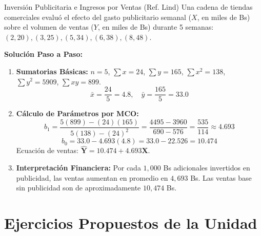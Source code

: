 \begin{ejemplo}{Inversión Publicitaria e Ingresos por Ventas (Ref. Lind)}
Una cadena de tiendas comerciales evaluó el efecto del gasto publicitario semanal ($X$, en miles de Bs) sobre el volumen de ventas ($Y$, en miles de Bs) durante 5 semanas:
$(2, 20), (3, 25), (5, 34), (6, 38), (8, 48)$.

\tcbline
\textbf{Solución Paso a Paso:}
\begin{enumerate}
    \item \textbf{Sumatorias Básicas:}
    $n = 5$, $\sum x = 24$, $\sum y = 165$, $\sum x^2 = 138$, $\sum y^2 = 5909$, $\sum xy = 899$.
    \[
    \bar{x} = \frac{24}{5} = 4.8, \quad \bar{y} = \frac{165}{5} = 33.0
    \]
    
    \item \textbf{Cálculo de Parámetros por MCO:}
    \[
    b_1 = \frac{5(899) - (24)(165)}{5(138) - (24)^2} = \frac{4495 - 3960}{690 - 576} = \frac{535}{114} \approx 4.693
    \]
    \[
    b_0 = 33.0 - 4.693(4.8) = 33.0 - 22.526 = 10.474
    \]
    Ecuación de ventas: $\mathbf{\hat{Y} = 10.474 + 4.693 X}$.
    
    \item \textbf{Interpretación Financiera:}
    Por cada $1{,}000$ Bs adicionales invertidos en publicidad, las ventas aumentan en promedio en $4{,}693$ Bs. Las ventas base sin publicidad son de aproximadamente $10{,}474$ Bs.
\end{enumerate}
\end{ejemplo}

\section{Ejercicios Propuestos de la Unidad}

